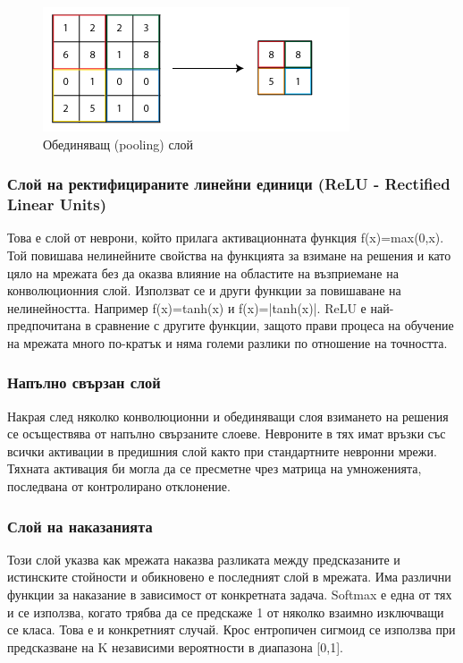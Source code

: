 \begin{figure}[H]
\centering
\includegraphics{Figures/Max_pooling.png}
\caption{Обединяващ (pooling) слой}
\label{fig:MaxPooling}
\end{figure}

\subsubsection{Слой на ректифицираните линейни единици (ReLU - Rectified Linear Units)}
Това е слой от неврони, който прилага активационната функция f(x)=max(0,x). Той повишава нелинейните свойства на функцията за взимане на решения и като цяло на мрежата без да оказва влияние на областите на възприемане на конволюционния слой.
Използват се и други функции за повишаване на нелинейността. Например f(x)=tanh(x) и f(x)=|tanh(x)|. ReLU е най-предпочитана в сравнение с другите функции, защото прави процеса на обучение на мрежата много по-кратък и няма големи разлики по отношение на точността.

\subsubsection{Напълно свързан слой}
Накрая след няколко конволюционни и обединяващи слоя взимането на решения се осъществява от напълно свързаните слоеве. Невроните в тях имат връзки със всички активации в предишния слой както при стандартните невронни мрежи. Тяхната активация би могла да се пресметне чрез матрица на умноженията, последвана от контролирано отклонение.

\subsubsection{Слой на наказанията}
Този слой указва как мрежата наказва разликата между предсказаните и истинските стойности и обикновено е последният слой в мрежата. Има различни функции за наказание в зависимост от конкретната задача. Softmax е една от тях и се използва, когато трябва да се предскаже 1 от няколко взаимно изключващи се класа. Това е и конкретният случай. Крос ентропичен сигмоид се използва при предсказване на K независими вероятности в диапазона [0,1].

